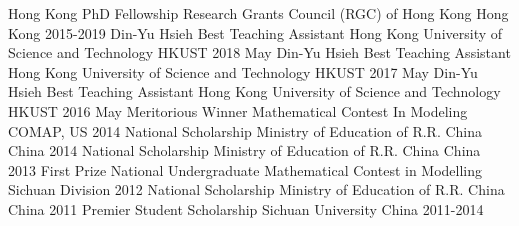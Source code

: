\begin{cvhonors}
  \cvhonor
    {Hong Kong PhD Fellowship}
    {Research Grants Council (RGC) of Hong Kong}
    {Hong Kong}
    {2015-2019}
  \cvhonor
    {Din-Yu Hsieh Best Teaching Assistant}
    {Hong Kong University of Science and Technology}
    {HKUST}
    {2018 May}
  \cvhonor
    {Din-Yu Hsieh Best Teaching Assistant}
    {Hong Kong University of Science and Technology}
    {HKUST}
    {2017 May}
  \cvhonor
    {Din-Yu Hsieh Best Teaching Assistant}
    {Hong Kong University of Science and Technology}
    {HKUST}
    {2016 May}
  \cvhonor
    {Meritorious Winner}
    {Mathematical Contest In Modeling}
    {COMAP, US}
    {2014}
  \cvhonor
    {National Scholarship}
    {Ministry of Education of R.R. China}
    {China}
    {2014}
  \cvhonor
    {National Scholarship}
    {Ministry of Education of R.R. China}
    {China}
    {2013}   
  \cvhonor
    {First Prize}
    {National Undergraduate Mathematical Contest in Modelling}
    {Sichuan Division}
    {2012}    
  \cvhonor
    {National Scholarship}
    {Ministry of Education of R.R. China}
    {China}
    {2011}
  \cvhonor
    {Premier Student Scholarship}
    {Sichuan University}
    {China}
    {2011-2014}
\end{cvhonors}


